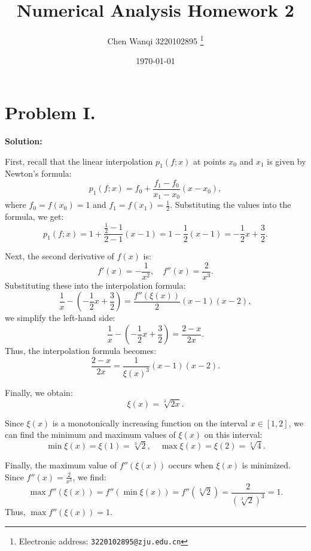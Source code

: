 \documentclass[a4paper]{article}
\begin{document}
\title{Numerical Analysis Homework 2}

\author{Chen Wanqi 3220102895
  \thanks{Electronic address: \texttt{3220102895@zju.edu.cn}}}


\date{\today}

\maketitle

\section*{Problem I.}

\textbf{Solution:}

First, recall that the linear interpolation \( p_1(f; x) \) at points \( x_0 \) and \( x_1 \) is given by Newton's formula:
\[
p_1(f; x) = f_0 + \frac{f_1 - f_0}{x_1 - x_0}(x - x_0),
\]
where \( f_0 = f(x_0) = 1 \) and \( f_1 = f(x_1) = \frac{1}{2} \). Substituting the values into the formula, we get:
\[
p_1(f; x) = 1 + \frac{\frac{1}{2} - 1}{2 - 1}(x - 1) = 1 - \frac{1}{2}(x - 1) = -\frac{1}{2}x + \frac{3}{2}.
\]

Next, the second derivative of \( f(x) \) is:
\[
f'(x) = -\frac{1}{x^2}, \quad f''(x) = \frac{2}{x^3}.
\]
Substituting these into the interpolation formula:
\[
\frac{1}{x} - \left( -\frac{1}{2}x + \frac{3}{2} \right) = \frac{f''(\xi(x))}{2} (x - 1)(x - 2),
\]
we simplify the left-hand side:
\[
\frac{1}{x} - \left( -\frac{1}{2}x + \frac{3}{2} \right) = \frac{2 - x}{2x}.
\]
Thus, the interpolation formula becomes:
\[
\frac{2 - x}{2x} = \frac{1}{\xi(x)^3} (x - 1)(x - 2).
\]

Finally, we obtain:
\[
\boxed{\xi(x) = \sqrt[3]{2x}.}
\]

Since \( \xi(x) \) is a monotonically increasing function on the interval \( x \in [1, 2] \), we can find the minimum and maximum values of \( \xi(x) \) on this interval:
\[
\boxed{\min \xi(x) = \xi(1) = \sqrt[3]{2}}, \quad \boxed{\max \xi(x) = \xi(2) = \sqrt[3]{4}.}
\]

Finally, the maximum value of \( f''(\xi(x)) \) occurs when \( \xi(x) \) is minimized. Since \( f''(x) = \frac{2}{x^3} \), we find:
\[
\max f''(\xi(x)) = f''(\min \xi(x)) = f''\left( \sqrt[3]{2} \right) = \frac{2}{\left( \sqrt[3]{2} \right)^3} = 1.
\]
Thus, \(\boxed{ \max f''(\xi(x)) = 1 }\).
\end{document}
